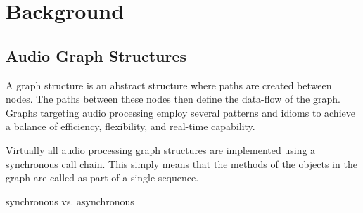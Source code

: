 \documentclass[twoside,a4paper]{article}
\begin{document}




\section{Background} %

\subsection{Audio Graph Structures} %

A graph structure is an abstract structure where paths are created between nodes.  The paths between these nodes then define the data-flow of the graph.  Graphs targeting audio processing employ several patterns and idioms to achieve a balance of efficiency, flexibility, and real-time capability.

Virtually all audio processing graph structures are implemented using a synchronous call chain.  This simply means that the methods of the objects in the graph are called as part of a single sequence.


synchronous vs. asynchronous

% 
% 
\end{document}
